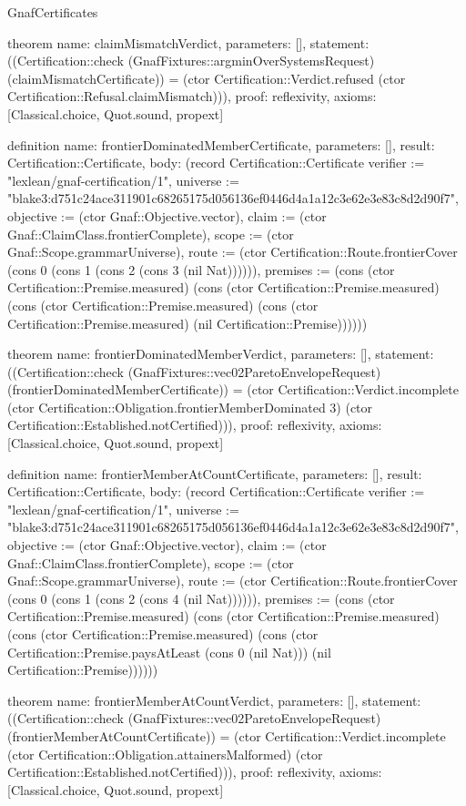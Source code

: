\begin{lexlean}{GnafCertificates}
\begin{semanticmodule}
theorem{
  name: claimMismatchVerdict,
  parameters: [],
  statement: ((Certification::check (GnafFixtures::argminOverSystemsRequest) (claimMismatchCertificate)) = (ctor Certification::Verdict.refused (ctor Certification::Refusal.claimMismatch))),
  proof: reflexivity{},
  axioms: [Classical.choice, Quot.sound, propext]
}

definition{
  name: frontierDominatedMemberCertificate,
  parameters: [],
  result: Certification::Certificate,
  body: (record Certification::Certificate {verifier := "lexlean/gnaf-certification/1", universe := "blake3:d751c24ace311901c68265175d056136ef0446d4a1a12c3e62e3e83c8d2d90f7", objective := (ctor Gnaf::Objective.vector), claim := (ctor Gnaf::ClaimClass.frontierComplete), scope := (ctor Gnaf::Scope.grammarUniverse), route := (ctor Certification::Route.frontierCover (cons 0 (cons 1 (cons 2 (cons 3 (nil Nat)))))), premises := (cons (ctor Certification::Premise.measured) (cons (ctor Certification::Premise.measured) (cons (ctor Certification::Premise.measured) (cons (ctor Certification::Premise.measured) (nil Certification::Premise)))))})
}

theorem{
  name: frontierDominatedMemberVerdict,
  parameters: [],
  statement: ((Certification::check (GnafFixtures::vec02ParetoEnvelopeRequest) (frontierDominatedMemberCertificate)) = (ctor Certification::Verdict.incomplete (ctor Certification::Obligation.frontierMemberDominated 3) (ctor Certification::Established.notCertified))),
  proof: reflexivity{},
  axioms: [Classical.choice, Quot.sound, propext]
}

definition{
  name: frontierMemberAtCountCertificate,
  parameters: [],
  result: Certification::Certificate,
  body: (record Certification::Certificate {verifier := "lexlean/gnaf-certification/1", universe := "blake3:d751c24ace311901c68265175d056136ef0446d4a1a12c3e62e3e83c8d2d90f7", objective := (ctor Gnaf::Objective.vector), claim := (ctor Gnaf::ClaimClass.frontierComplete), scope := (ctor Gnaf::Scope.grammarUniverse), route := (ctor Certification::Route.frontierCover (cons 0 (cons 1 (cons 2 (cons 4 (nil Nat)))))), premises := (cons (ctor Certification::Premise.measured) (cons (ctor Certification::Premise.measured) (cons (ctor Certification::Premise.measured) (cons (ctor Certification::Premise.paysAtLeast (cons 0 (nil Nat))) (nil Certification::Premise)))))})
}

theorem{
  name: frontierMemberAtCountVerdict,
  parameters: [],
  statement: ((Certification::check (GnafFixtures::vec02ParetoEnvelopeRequest) (frontierMemberAtCountCertificate)) = (ctor Certification::Verdict.incomplete (ctor Certification::Obligation.attainersMalformed) (ctor Certification::Established.notCertified))),
  proof: reflexivity{},
  axioms: [Classical.choice, Quot.sound, propext]
}


\end{semanticmodule}
\end{lexlean}
